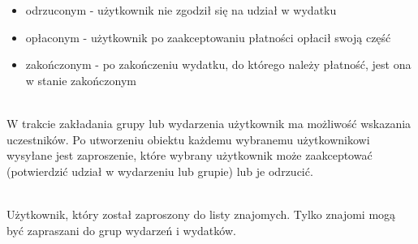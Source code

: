 \begin{description}[leftmargin={15pt},labelindent={0pt}]
\begin{itemize}
    \item odrzuconym - użytkownik nie zgodził się na udział w wydatku
    \item opłaconym - użytkownik po zaakceptowaniu płatności opłacił swoją część
    \item zakończonym - po zakończeniu wydatku, do którego należy płatność, jest ona w stanie zakończonym
  \end{itemize}
\item[Zaproszenie] \hfill \\ W trakcie zakładania grupy lub wydarzenia użytkownik ma możliwość wskazania uczestników. Po utworzeniu obiektu każdemu wybranemu użytkownikowi wysyłane jest zaproszenie, które wybrany użytkownik może zaakceptować (potwierdzić udział w wydarzeniu lub grupie) lub je odrzucić.
\item[Znajomy] \hfill \\ Użytkownik, który został zaproszony do listy znajomych. Tylko znajomi mogą być zapraszani do grup wydarzeń i wydatków.
\end{description}


